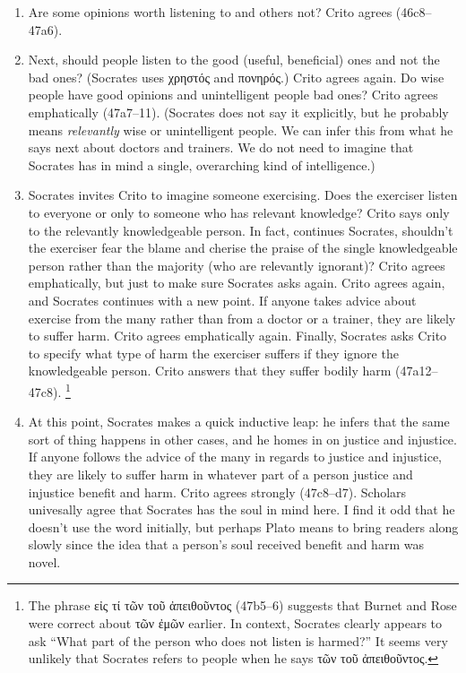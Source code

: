 \documentclass[12pt,letterpaper]{article}
\begin{document}
\begin{enumerate}

    \item Are some opinions worth listening to and others not?
        Crito agrees (46c8--47a6).

    \item Next, should people listen to the good (useful, beneficial) ones and not the bad ones?
        (Socrates uses \textgreek{χρηστός} and \textgreek{πονηρός}.)
        Crito agrees again.
        Do wise people have good opinions and unintelligent people bad ones?
        Crito agrees emphatically (47a7--11).
        (Socrates does not say it explicitly, but he probably means \textit{relevantly} wise or unintelligent people.
        We can infer this from what he says next about doctors and trainers.
        We do not need to imagine that Socrates has in mind a single, overarching kind of intelligence.)

    \item Socrates invites Crito to imagine someone exercising.
        Does the exerciser listen to everyone or only to someone who has relevant knowledge?
        Crito says only to the relevantly knowledgeable person.
        In fact, continues Socrates, shouldn't the exerciser fear the blame and cherise the praise of the single knowledgeable person rather than the majority (who are relevantly ignorant)?
        Crito agrees emphatically, but just to make sure Socrates asks again.
        Crito agrees again, and Socrates continues with a new point.
        If anyone takes advice about exercise from the many rather than from a doctor or a trainer, they are likely to suffer harm.
        Crito agrees emphatically again.
        Finally, Socrates asks Crito to specify what type of harm the exerciser suffers if they ignore the knowledgeable person.
        Crito answers that they suffer bodily harm (47a12--47c8).%
        \footnote{The phrase \textgreek{εἰς τί τῶν τοῦ ἀπειθοῦντος} (47b5--6) suggests that Burnet and Rose were correct about \textgreek{τῶν ἐμῶν} earlier.
        In context, Socrates clearly appears to ask ``What part of the person who does not listen is harmed?''
        It seems very unlikely that Socrates refers to people when he says \textgreek{τῶν τοῦ ἀπειθοῦντος}.}

    \item At this point, Socrates makes a quick inductive leap: he infers that the same sort of thing happens in other cases, and he homes in on justice and injustice.
        If anyone follows the advice of the many in regards to justice and injustice, they are likely to suffer harm in whatever part of a person justice and injustice benefit and harm.
        Crito agrees strongly (47c8--d7).
        Scholars univesally agree that Socrates has the soul in mind here.
        I find it odd that he doesn't use the word initially, but perhaps Plato means to bring readers along slowly since the idea that a person's soul received benefit and harm was novel.


\end{enumerate}
\end{document}
